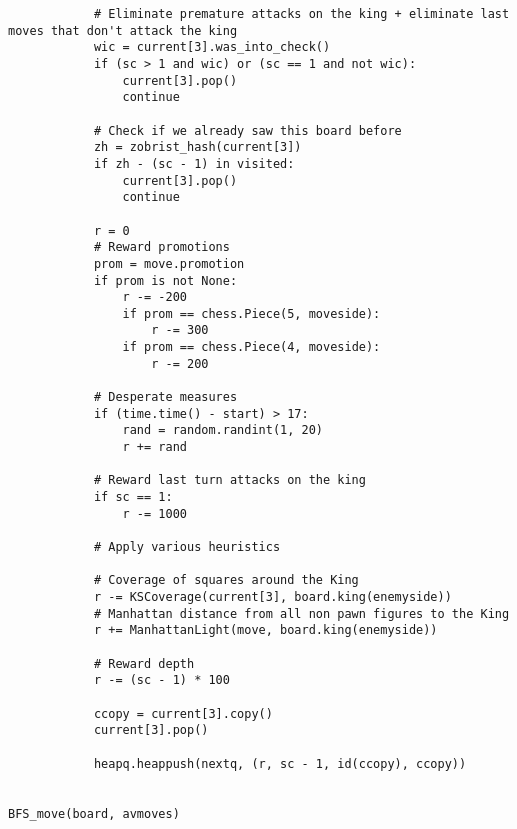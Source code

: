 \documentclass[runningheads]{llncs}
\begin{document}
\begin{lstlisting}
            # Eliminate premature attacks on the king + eliminate last moves that don't attack the king
            wic = current[3].was_into_check()
            if (sc > 1 and wic) or (sc == 1 and not wic):
                current[3].pop()
                continue

            # Check if we already saw this board before
            zh = zobrist_hash(current[3])
            if zh - (sc - 1) in visited:
                current[3].pop()
                continue

            r = 0
            # Reward promotions
            prom = move.promotion
            if prom is not None:
                r -= -200
                if prom == chess.Piece(5, moveside):
                    r -= 300
                if prom == chess.Piece(4, moveside):
                    r -= 200

            # Desperate measures
            if (time.time() - start) > 17:
                rand = random.randint(1, 20)
                r += rand

            # Reward last turn attacks on the king
            if sc == 1:
                r -= 1000

            # Apply various heuristics

            # Coverage of squares around the King
            r -= KSCoverage(current[3], board.king(enemyside))
            # Manhattan distance from all non pawn figures to the King
            r += ManhattanLight(move, board.king(enemyside))

            # Reward depth
            r -= (sc - 1) * 100

            ccopy = current[3].copy()
            current[3].pop()

            heapq.heappush(nextq, (r, sc - 1, id(ccopy), ccopy))


BFS_move(board, avmoves)

\end{lstlisting}
 
 
 
\end{document}
